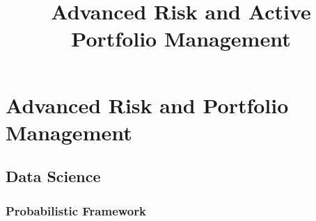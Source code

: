 \documentclass{article}
\title{Advanced Risk and Active Portfolio Management}
\theoremstyle{definition}
\theoremstyle{remark}
\begin{document}
\maketitle

\tableofcontents




\section{Advanced Risk and Portfolio Management}


\subsection{Data Science}

\subsubsection{Probabilistic Framework}
\end{document}
